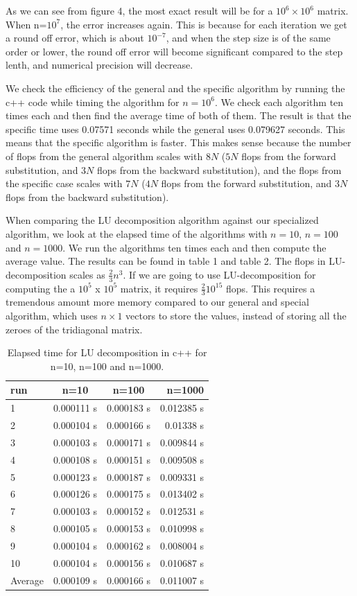 \documentclass[%
oneside,                 %
final,                   %
10pt]{article}
\begin{document}
As we can see from figure 4, the most exact result will be for a $10^6\times 10^6$ matrix. When n=$10^7$, the error increases again. This is because for each iteration we get a round off error, which is about $10^{-7}$, and when the step size is of the same order or lower, the round off error will become significant compared to the step lenth, and numerical precision will decrease.


We check the efficiency of the general and the specific algorithm by running the c++ code while timing the algorithm for $n=10^6$. We check each algorithm ten times each and then find the average time of both of them. The result is that the specific time uses 0.07571 seconds while the general uses 0.079627 seconds. This means that the specific algorithm is faster.
This makes sense because the number of flops from the general algorithm scales with $8N$ ($5N$ flops from the forward substitution, and $3N$ flops from the backward substitution), and the flops from the specific case scales with $7N$ ($4N$ flops from the forward substitution, and $3N$ flops from the backward substitution).

When comparing the LU decomposition algorithm against our specialized algorithm, we look at the elapsed time of the algorithms with $n=10$, $n=100$ and $n=1000$. We run the algorithms ten times each and then compute the average value. The results can be found in table 1 and table 2.
The flops in LU-decomposition scales as $\frac{2}{3} n^3$. If we are going to use LU-decomposition for computing the a $10^5$ x $10^5$ matrix, it requires $\frac{2}{3}10^{15}$ flops. This requires a tremendous amount more memory compared to our general and special algorithm, which uses $n\times 1$ vectors to store the values, instead of storing all the zeroes of the tridiagonal matrix.

\begin{table}[H]
    \centering
    \begin{tabular}{|l|c|c|r|}
    \hline
     run & n=10 & n=100 & n=1000\\
     \hline
      1  & 0.000111 s & 0.000183 s & 0.012385 s\\
      2  & 0.000104 s & 0.000166 s & 0.01338 s\\
      3  & 0.000103 s & 0.000171 s & 0.009844 s\\
      4  & 0.000108 s & 0.000151 s & 0.009508 s\\
      5  & 0.000123 s & 0.000187 s & 0.009331 s\\
      6  & 0.000126 s & 0.000175 s & 0.013402 s\\
      7  & 0.000103 s & 0.000152 s & 0.012531 s\\
      8  & 0.000105 s & 0.000153 s & 0.010998 s\\
      9  & 0.000104 s & 0.000162 s & 0.008004 s\\
      10 & 0.000104 s & 0.000156 s & 0.010687 s\\
      \hline
      Average & 0.000109 s & 0.000166 s & 0.011007 s\\
      \hline
    \end{tabular}
    \caption{Elapsed time for LU decomposition in c++ for n=10, n=100 and n=1000.}
    \label{tab:my_label}
\end{table}
\end{document}
